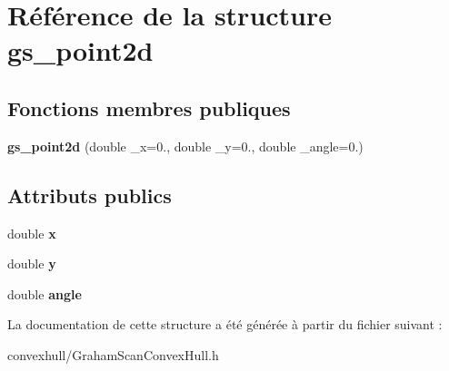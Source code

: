 \hypertarget{structgs__point2d}{\section{Référence de la structure gs\-\_\-point2d}
\label{structgs__point2d}
}
\subsection*{Fonctions membres publiques}
\begin{DoxyCompactItemize}
\item 
\hypertarget{structgs__point2d_a43686396b9d5c93398e3fc2c37d21937}{{\bfseries gs\-\_\-point2d} (double \-\_\-x=0., double \-\_\-y=0., double \-\_\-angle=0.)}\label{structgs__point2d_a43686396b9d5c93398e3fc2c37d21937}

\end{DoxyCompactItemize}
\subsection*{Attributs publics}
\begin{DoxyCompactItemize}
\item 
\hypertarget{structgs__point2d_addfa94fc4fe707aadbf06129dbd475b7}{double {\bfseries x}}\label{structgs__point2d_addfa94fc4fe707aadbf06129dbd475b7}

\item 
\hypertarget{structgs__point2d_ac058f2b021a30e984483ae1a58fe78f5}{double {\bfseries y}}\label{structgs__point2d_ac058f2b021a30e984483ae1a58fe78f5}

\item 
\hypertarget{structgs__point2d_abcdef4d19a594e296c224f4a2bf23aac}{double {\bfseries angle}}\label{structgs__point2d_abcdef4d19a594e296c224f4a2bf23aac}

\end{DoxyCompactItemize}


La documentation de cette structure a été générée à partir du fichier suivant \-:\begin{DoxyCompactItemize}
\item 
convexhull/Graham\-Scan\-Convex\-Hull.\-h\end{DoxyCompactItemize}
